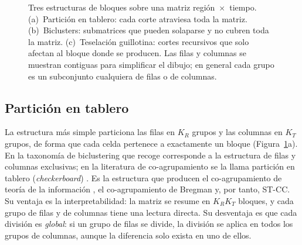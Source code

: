 \begin{figure}[t]
\centering
{}
\caption{Tres estructuras de bloques sobre una matriz región~$\times$~tiempo.
(a)~Partición en tablero: cada corte atraviesa toda la matriz. (b)~Biclusters:
submatrices que pueden solaparse y no cubren toda la matriz. (c)~Teselación
guillotina: cortes recursivos que solo afectan al bloque donde se producen. Las
filas y columnas se muestran contiguas para simplificar el dibujo; en general
cada grupo es un subconjunto cualquiera de filas o de columnas.}
\label{fig:estructuras}
\end{figure}

\subsection{Partición en tablero}

La estructura más simple particiona las filas en $K_R$ grupos y las columnas en
$K_T$ grupos, de forma que cada celda pertenece a exactamente un bloque
(Figura~\ref{fig:estructuras}a). En la taxonomía de biclustering que recoge
\cite{Castanho2024} corresponde a la estructura de filas y columnas exclusivas;
en la literatura de co-agrupamiento se la llama partición en tablero
(\emph{checkerboard}) \cite{Liu2021}. Es la estructura que producen el
co-agrupamiento de teoría de la información \cite{Dhillon2003}, el co-agrupamiento
de Bregman \cite{Banerjee2007} y, por tanto, ST-CC. Su ventaja es la
interpretabilidad: la matriz se resume en $K_R K_T$ bloques, y cada grupo de filas
y de columnas tiene una lectura directa. Su desventaja es que cada división es
\emph{global}: si un grupo de filas se divide, la división se aplica en todos los
grupos de columnas, aunque la diferencia solo exista en uno de ellos.

